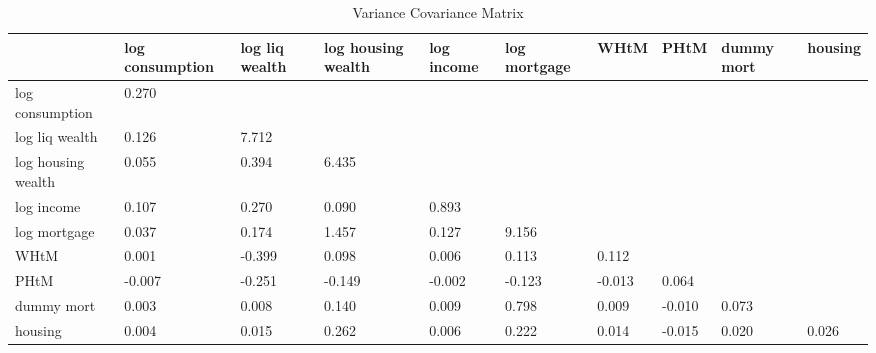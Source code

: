 \begin{table}[htbp]
\caption{\label{clabel} Variance Covariance Matrix}\centering\medskip
\begin{tabular}{llllllllll} \hline \hline
 & log consumption  & log liq wealth  & log housing wealth  & log income  & log mortgage  & WHtM  & PHtM  & dummy mort  & housing  \\  \hline 
log consumption &     0.270 \\  
log liq wealth &     0.126 &     7.712 \\  
log housing wealth &     0.055 &     0.394 &     6.435 \\  
log income &     0.107 &     0.270 &     0.090 &     0.893 \\  
log mortgage &     0.037 &     0.174 &     1.457 &     0.127 &     9.156 \\  
WHtM &     0.001 &    -0.399 &     0.098 &     0.006 &     0.113 &     0.112 \\  
PHtM &    -0.007 &    -0.251 &    -0.149 &    -0.002 &    -0.123 &    -0.013 &     0.064 \\  
dummy mort &     0.003 &     0.008 &     0.140 &     0.009 &     0.798 &     0.009 &    -0.010 &     0.073 \\  
housing &     0.004 &     0.015 &     0.262 &     0.006 &     0.222 &     0.014 &    -0.015 &     0.020 &     0.026 \\  
\hline \hline \end{tabular}
\end{table}
